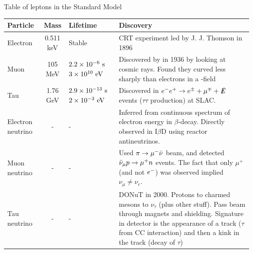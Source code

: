 \begin{table}
\begin{center}
Table of leptons in the Standard Model \\
\def\arraystretch{1.5}
\begin{tabular}{|l||c|p{}|p{}|}
\hline
Particle & Mass & Lifetime & Discovery\\
\hline
\hline
Electron & 0.511 keV & Stable & CRT experiment led by J. J. Thomson in 1896\\
\hline
Muon & 105 MeV & $2.2\times 10^{-6}~\text{s}$ \newline $3\times 10^{10}~\text{eV}$ & Discovered by in 1936 by looking at cosmic rays. Found they curved less sharply than electrons in a \B-field\\
\hline
Tau & 1.76 GeV & $2.9\times 10^{-13}~\text{s}$ \newline $2\times 10^{-3}~\text{eV}$ & Discovered in $e^{-}e^{+} \rightarrow e^\pm + \mu^\mp + \slashed{E}$ events ($\tau\tau$ production) at SLAC.\\
\hline
Electron neutrino & - & - & Inferred from continuous spectrum of electron energy in $\beta$-decay. Directly observed in I$\beta$D using reactor antineutrinos.\\
\hline
Muon neutrino & - & - & Used $\pi \rightarrow \mu^- {\bar{\nu}}$ beam, and detected ${\bar{\nu}}_\mu p \rightarrow \mu^+ n$ events. The fact that only $\mu^+$ (and not $e^{-}$) was observed implied $\nu_\mu \neq \nu_e$.\\
\hline
Tau neutrino & - & - & DONuT in 2000. Protons to charmed mesons to $\nu_\tau$ (plus other stuff). Pass beam through magnets and shielding. Signature in detector is the appearance of a track ($\tau$ from CC interaction) and then a kink in the track (decay of $\tau$)  \\
\hline
\end{tabular}
\vspace{5mm}


\end{center}
\end{table}
